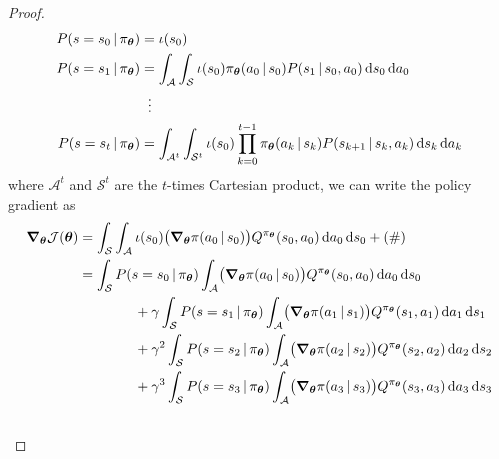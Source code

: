 \begin{proof}
			\begin{align}
				P(s = s_0 \,\vert\, \pi_{\bm{\theta}}) & = \iota(s_0)                                                                                                                                                                      \\
				P(s = s_1 \,\vert\, \pi_{\bm{\theta}}) & = \int_\mathcal{A} \int_\mathcal{S} \iota(s_0) \pi_{\bm{\theta}}(a_0 \,\vert\, s_0) P(s_1 \,\vert\, s_0, a_0) \dd{s_0} \dd{a_0}                                                        \\
				                                     & \;\;\vdots                                                                                                                                                                        \\
				P(s = s_t \,\vert\, \pi_{\bm{\theta}}) & = \int_{\mathcal{A}^t} \int_{\mathcal{S}^t} \iota(s_0) \prod_{k = 0}^{t - 1} \pi_{\bm{\theta}}(a_k \,\vert\, s_k) P(s_{k + 1} \,\vert\, s_k, a_k) \dd{s_k} \dd{a_k}  \label{eq:pgtDef}
			\end{align}
			where \(\mathcal{A}^t\) and \(\mathcal{S}^t\) are the \(t\)-times Cartesian product, we can write the policy gradient as
			\begin{align}
				\grad_{\vec{\theta}} \mathcal{J}(\vec{\theta})
				 & = \int_\mathcal{S} \int_\mathcal{A} \iota(s_0) \bigl( \grad_{\vec{\theta}} \pi(a_0 \given s_0) \bigr) Q^{\pi_{\vec{\theta}}}(s_0, a_0) \dd{a_0} \dd{s_0} + (\#)                                                                       \\
				 & = \int_\mathcal{S} P(s = s_0 \given \pi_{\vec{\theta}}) \int_\mathcal{A} \bigl( \grad_{\vec{\theta}} \pi(a_0 \given s_0) \bigr) Q^{\pi_{\vec{\theta}}}(s_0, a_0) \dd{a_0} \dd{s_0}                                                    \\&\qquad\qquad
				+ \gamma \int_\mathcal{S} P(s = s_1 \given \pi_{\vec{\theta}}) \int_\mathcal{A} \bigl( \grad_{\vec{\theta}} \pi(a_1 \given s_1) \bigr) Q^{\pi_{\vec{\theta}}}(s_1, a_1) \dd{a_1} \dd{s_1}                                                \\&\qquad\qquad
				+ \gamma^2 \int_\mathcal{S} P(s = s_2 \given \pi_{\vec{\theta}}) \int_\mathcal{A} \bigl( \grad_{\vec{\theta}} \pi(a_2 \given s_2) \bigr) Q^{\pi_{\vec{\theta}}}(s_2, a_2) \dd{a_2} \dd{s_2}                                              \\&\qquad\qquad
				+ \gamma^3 \int_\mathcal{S} P(s = s_3 \given \pi_{\vec{\theta}}) \int_\mathcal{A} \bigl( \grad_{\vec{\theta}} \pi(a_3 \given s_3) \bigr) Q^{\pi_{\vec{\theta}}}(s_3, a_3) \dd{a_3} \dd{s_3}                                              \\&\qquad\qquad

\end{align}
\end{proof}
